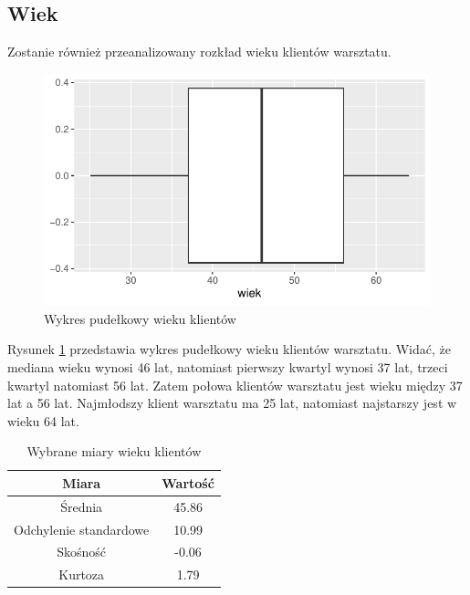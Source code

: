 \documentclass{article}\usepackage[]{graphicx}\usepackage[]{xcolor}
\makeatletter
\def\maxwidth{ %
  \ifdim\Gin@nat@width>\linewidth
    \linewidth
  \else
    \Gin@nat@width
  \fi
}
\newenvironment{knitrout}{}{} %
\makeatother
\begin{document}
\subsection{Wiek}

Zostanie również przeanalizowany rozkład wieku klientów warsztatu.





\begin{knitrout}
\color{fgcolor}\begin{figure}[H]

{\centering \includegraphics[width=\maxwidth]{figure/fig_wiek-1} 

}

\caption[Wykres pudełkowy wieku klientów]{Wykres pudełkowy wieku klientów}\label{fig:fig_wiek}
\end{figure}

\end{knitrout}

Rysunek \ref{fig:fig_wiek} przedstawia wykres pudełkowy wieku klientów warsztatu. Widać, że mediana wieku wynosi 46 lat, natomiast pierwszy kwartyl wynosi 37 lat, trzeci kwartyl natomiast 56 lat. Zatem połowa klientów warsztatu jest wieku między 37 lat a 56 lat.
Najmłodszy klient warsztatu ma 25 lat, natomiast najstarszy jest w wieku 64 lat.



\begin{table}[H]
\centering
\begin{tabular}{c|c} \hline
Miara & Wartość \\ \hline
Średnia & 45.86 \\ 
Odchylenie standardowe & 10.99 \\
Skośność & -0.06  \\ 
Kurtoza & 1.79 \\ \hline
\end{tabular}
\caption{Wybrane miary wieku klientów}
\label{tab_wiek}
\end{table}
\end{document}
